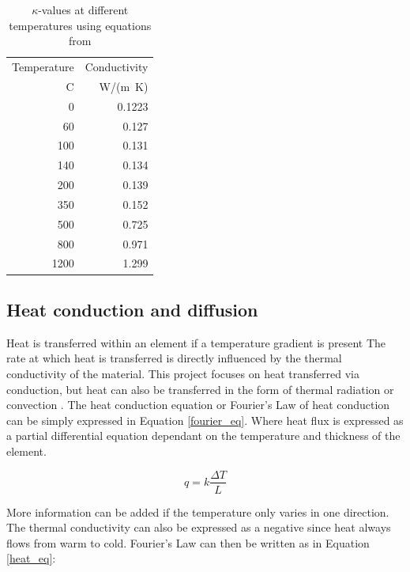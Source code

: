 \begin{table} [H]
	\caption{$\kappa$-values at different temperatures using equations from \cite{Shi:2021}}
	\label{tableshi}
	\centering
	\begin{tabular}{ r r }
	\toprule
	Temperature & Conductivity\\
	{\textdegree}C & W/(m\ K)\\
	\midrule
	0&0.1223  \\
		60& 0.127 \\ 
		100&0.131 \\ 
		140&0.134\\ 
		200&0.139\\ 
		350&0.152\\
		 500& 0.725 \\ 
		 800& 0.971\\ 
		 1200& 1.299 \\
	\bottomrule
	\end{tabular}
\end{table}

\subsection{Heat conduction and diffusion}\label{heatconsec}	 
	Heat is transferred within an element if a temperature gradient is present
	The rate at which heat is transferred is directly influenced by the thermal conductivity of the material. 
	This project focuses on heat transferred via conduction, but heat can also be transferred in the form of thermal radiation or convection \cite{Fish:2007}.
	The heat conduction equation or Fourier's Law of heat conduction \citep{Fourier:1878} can be simply expressed in  Equation \ref{fourier_eq}.
	Where heat flux is expressed as a partial differential equation dependant on the temperature and thickness of the element. 

	\begin{equation}
	\label{fourier_eq}
		q = k \frac{\Delta T}{L}
	\end{equation}

	More information can be added if the temperature only varies in one direction. 
	The thermal conductivity can also be expressed as a negative since heat always flows from warm to cold.
	Fourier's Law can then be written as in Equation \ref{heat_eq}:
	
